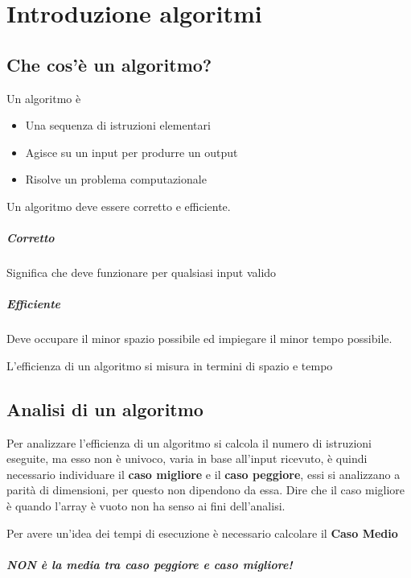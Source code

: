 \chapter{Introduzione algoritmi}
\section{Che cos'è un algoritmo?}
Un algoritmo è
\begin{itemize}
    \item Una sequenza di istruzioni elementari 
    \item Agisce su un input per produrre un output
    \item Risolve un problema computazionale
\end{itemize}

Un algoritmo deve essere corretto e efficiente.

\paragraph{Corretto} Significa che deve funzionare per qualsiasi input valido
\paragraph{Efficiente} Deve occupare il minor spazio possibile ed impiegare il minor tempo possibile.

L'efficienza di un algoritmo si misura in termini di spazio e tempo

\section{Analisi di un algoritmo}
Per analizzare l'efficienza di un algoritmo si calcola il numero di istruzioni eseguite, ma esso non è univoco, varia in base all'input ricevuto, 
è quindi necessario individuare il \textbf{caso migliore} e il \textbf{caso peggiore}, essi si analizzano a parità di dimensioni, per questo non dipendono da essa.
Dire che il caso migliore è quando l'array è vuoto non ha senso ai fini dell'analisi.

Per avere un'idea dei tempi di esecuzione è necessario calcolare il \textbf{Caso Medio}
\paragraph{NON è la media tra caso peggiore e caso migliore!}

